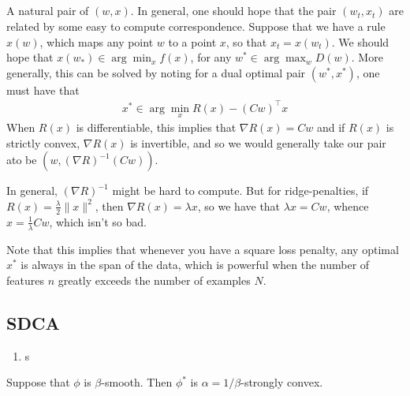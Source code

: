 \subsection{}
A natural pair of $(w,x)$. In general, one should hope that the pair $(w_t,x_t)$ are related by some easy to compute correspondence. Suppose that we have a rule $x(w)$, which maps any point $w$ to a point $x$, so that $x_t = x(w_t)$. We should hope that $x(w_*) \in \arg\min_{x} f(x)$, for any $w^* \in \arg\max_w D(w)$. More generally, this can be solved by noting for a dual optimal pair $(w^*,x^*)$, one must have that 
\begin{eqnarray}
x^* \in \arg\min_{x} R(x) - (Cw)^{\top}x
\end{eqnarray}
When $R(x)$ is differentiable, this implies that $\nabla R(x) = Cw$ and if $R(x)$ is strictly convex, $\nabla R(x)$ is invertible, and so we would generally take our pair ato be $(w,(\nabla R)^{-1}(Cw))$. 

In general, $(\nabla R)^{-1}$ might be hard to compute. But for ridge-penalties, if $R(x) = \frac{\lambda}{2} \|x\|^2$, then $\nabla R(x) = \lambda x$, so we have that $\lambda x = Cw$, whence $x = \frac{1}{\lambda}Cw$, which isn't so bad. 

Note that this implies that whenever you have a square loss penalty, any optimal $x^*$ is always in the span of the data, which is powerful when the number of features $n$ greatly exceeds the number of examples $N$.
\subsection{SDCA}
\begin{enumerate}
	\item s
\end{enumerate}

\begin{lemma} Suppose that $\phi$ is $\beta$-smooth. Then $\phi^*$ is $\alpha = 1/\beta$-strongly convex. 
\end{lemma}


